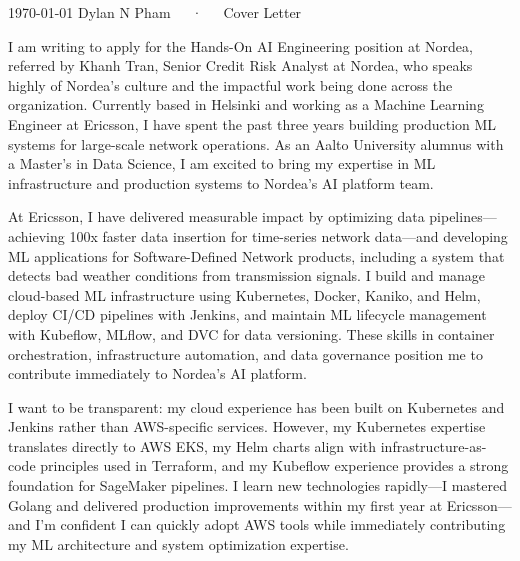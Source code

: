 \documentclass[11pt, a4paper]{awesome-cv}
\begin{document}
\makecvheader[R]

\makecvfooter
  {\today}
  {Dylan N Pham~~~·~~~Cover Letter}
  {}

\makelettertitle

\begin{cvletter}

I am writing to apply for the Hands-On AI Engineering position at Nordea, referred by Khanh Tran, Senior Credit Risk Analyst at Nordea, who speaks highly of Nordea's culture and the impactful work being done across the organization. Currently based in Helsinki and working as a Machine Learning Engineer at Ericsson, I have spent the past three years building production ML systems for large-scale network operations. As an Aalto University alumnus with a Master's in Data Science, I am excited to bring my expertise in ML infrastructure and production systems to Nordea's AI platform team.

At Ericsson, I have delivered measurable impact by optimizing data pipelines—achieving 100x faster data insertion for time-series network data—and developing ML applications for Software-Defined Network products, including a system that detects bad weather conditions from transmission signals. I build and manage cloud-based ML infrastructure using Kubernetes, Docker, Kaniko, and Helm, deploy CI/CD pipelines with Jenkins, and maintain ML lifecycle management with Kubeflow, MLflow, and DVC for data versioning. These skills in container orchestration, infrastructure automation, and data governance position me to contribute immediately to Nordea's AI platform.

I want to be transparent: my cloud experience has been built on Kubernetes and Jenkins rather than AWS-specific services. However, my Kubernetes expertise translates directly to AWS EKS, my Helm charts align with infrastructure-as-code principles used in Terraform, and my Kubeflow experience provides a strong foundation for SageMaker pipelines. I learn new technologies rapidly—I mastered Golang and delivered production improvements within my first year at Ericsson—and I'm confident I can quickly adopt AWS tools while immediately contributing my ML architecture and system optimization expertise.


\end{cvletter}
\end{document}
